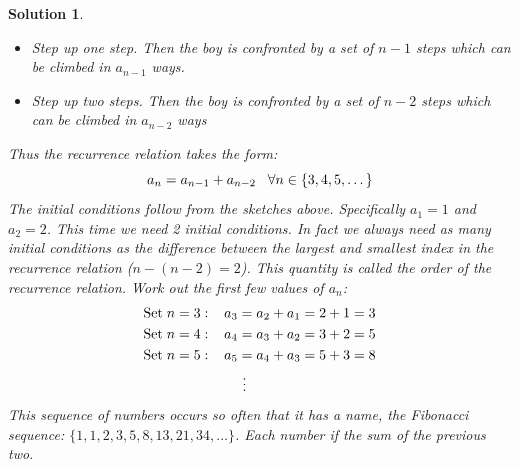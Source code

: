 \documentclass[12pt, letterpaper, onecolumn, conference, final]{IEEEtran}
\theoremstyle{definition}
\theoremstyle{plain}
\newtheorem{solution}{Solution}[section]
\begin{document}
\begin{solution}
\begin{itemize}
\vspace{.2cm}
\item[(i)]
Step up one step. Then the boy is confronted by a set of $n-1$ steps which can be climbed in $a_{n-1}$ ways.

\vspace{.2cm}
\item[(ii)]
Step up two steps. Then the boy is confronted by a set of $n-2$ steps which can be climbed in $a_{n-2}$ ways

\end{itemize}
Thus the recurrence relation takes the form:
\begin{equation*}
a_n = a_{n-1} + a_{n-2} \hspace{.3cm} \forall n \in \{3, 4, 5, \dots\}
\end{equation*}
The initial conditions follow from the sketches above. Specifically $a_1=1$ and $a_2=2$. This time we need 2 initial conditions. In fact we always need as many initial conditions as the difference between the largest and smallest index in the recurrence relation ($n - (n - 2) = 2$). This quantity is called the order of the recurrence relation. Work out the first few values of $a_n$:
\begin{equation*}
\begin{split}
&\text{Set} \hspace{.1cm} n = 3: \hspace{.3cm} a_3 = a_2 + a_1 = 2 + 1 = 3 \\
&\text{Set} \hspace{.1cm} n = 4: \hspace{.3cm} a_4 = a_3 + a_2 = 3 + 2 = 5 \\ 
&\text{Set} \hspace{.1cm} n = 5: \hspace{.3cm} a_5 = a_4 + a_3 = 5 + 3 = 8 \\ 
& \hspace{2.5cm} \vdots
\end{split}
\end{equation*}
This sequence of numbers occurs so often that it has a name, the Fibonacci sequence: $\{1, 1, 2, 3, 5, 8, 13, 21, 34, \dots\}$. Each number if the sum of the previous two.
\end{solution}
\end{document}
